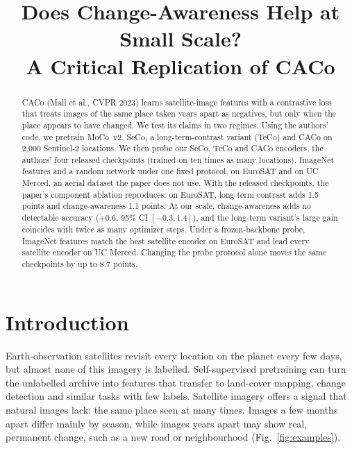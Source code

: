 \documentclass[conference]{IEEEtran}
\begin{document}
\title{Does Change-Awareness Help at Small Scale?\\A Critical Replication of CACo}

\author{
\and
{}
\and
{}
\and
{}
}

\maketitle

\begin{abstract}
CACo (Mall et al., CVPR 2023) learns satellite-image features with a contrastive
loss that treats images of the same place taken years apart as negatives, but
only when the place appears to have changed. We test its claims in two regimes.
Using the authors' code, we pretrain MoCo~v2, SeCo, a long-term-contrast variant
(TeCo) and CACo on 2,000 Sentinel-2 locations. We then probe our SeCo, TeCo and
CACo encoders, the authors' four released checkpoints (trained on ten times as
many locations), ImageNet features and a random network under one fixed protocol,
on EuroSAT and on UC Merced, an aerial dataset the paper does not use. With the
released checkpoints, the paper's component ablation reproduces: on EuroSAT,
long-term contrast adds 1.5 points and change-awareness 1.1 points. At our scale,
change-awareness adds no detectable accuracy ($+0.6$, 95\% CI $[-0.3, 1.4]$),
and the long-term variant's large gain coincides with twice as many optimizer
steps. Under a frozen-backbone probe, ImageNet features match the best satellite
encoder on EuroSAT and lead every satellite encoder on UC Merced. Changing the
probe protocol alone moves the same checkpoints by up to 8.7 points.
\end{abstract}

\section{Introduction}
Earth-observation satellites revisit every location on the planet every few
days, but almost none of this imagery is labelled. Self-supervised pretraining
can turn the unlabelled archive into features that transfer to land-cover
mapping, change detection and similar tasks with few labels. Satellite imagery
offers a signal that natural images lack: the same place seen at many times.
Images a few months apart differ mainly by season, while images years apart may
show real, permanent change, such as a new road or neighbourhood
(Fig.~\ref{fig:examples}).
\end{document}
